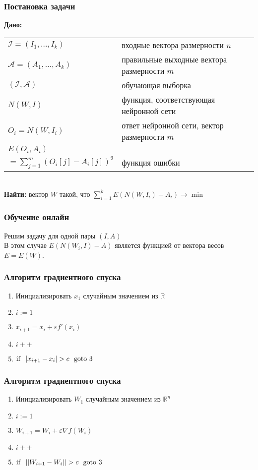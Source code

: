 \documentclass[24pt,pdf,hyperref={unicode}]{beamer}
\begin{document}
\begin{frame}\frametitle{Постановка задачи}
{\bf Дано:}
\begin{tabular}{p{4cm} p{6cm}}
 $\mathcal{I}=(I_1,\ldots,I_k)$ & входные вектора размерности $n$\\[0.1cm]
 $\mathcal{A}=(A_1,\ldots,A_k)$ & правильные выходные вектора размерности $m$\\[0.1cm]
 $(\mathcal{I},\mathcal{A})$ & обучающая выборка  \\[0.1cm]
 $N(W,I)$ & функция, соответствующая нейронной сети \\[0.1cm]
 $O_i=N(W,I_i)$ & ответ нейронной сети, вектор размерности $m$ \\[0.1cm]
$E(O_i,A_i)$ & \\
$=\sum_{j=1}^{m} (O_i[j]-A_i[j])^2 $ & функция ошибки \\
 \end{tabular}\\[1cm]
{\bf Найти:}
вектор $W$ такой, что $\sum_{i=1}^k E(N(W,I_i)-A_i)\rightarrow \min$
\end{frame}


\begin{frame}\frametitle{Обучение онлайн}
Решим задачу для одной пары $(I,A)$ \\[2cm]

В этом случае $E(N(W_i,I)-A)$ является функцией от вектора весов $E=E(W)$. 
\end{frame}



\begin{frame}\frametitle{Алгоритм градиентного спуска}
\begin{enumerate}
 \item Инициализировать $x_1$ случайным значением из $\mathbb{R}$
 \item $i:=1$
 \item $x_{i+1}=x_i+\varepsilon f'(x_i)$
 \item $i++$
 \item ${\rm if}\ \ |x_{i+1}-x_i|>c\ \ {\rm goto}\ 3$
\end{enumerate}
\end{frame}

\begin{frame}\frametitle{Алгоритм градиентного спуска}
\begin{enumerate}
 \item Инициализировать $W_1$ случайным значением из $\mathbb{R}^n$
 \item $i:=1$
 \item $W_{i+1}=W_i+\varepsilon \nabla f(W_i)$
 \item $i++$
 \item ${\rm if}\ \ ||W_{i+1}-W_i||>c\ \ {\rm goto}\ 3$
\end{enumerate}
\end{frame}
\end{document}
